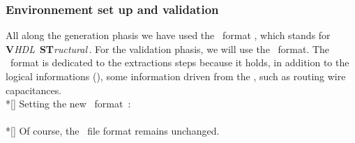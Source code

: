      \subsubsection{Environnement set up and validation}
     \nopagebreak
     \forceindent
       All along the generation phasis we have used the \netlist\ format \fvst,
     which stands for {\bf V}{\it HDL}\, {\bf ST}{\it ructural}\,. For the
     validation phasis, we will use the \fal\ format. The \fal\ format is
     dedicated to the extractions steps because it holds, in addition to
     the logical informations (\netlist), some information driven from
     the \layout, such as routing wire capacitances.
     \\*[\bigskipamount]
     \indent
       Setting the new \netlist\ format~:\\
     \nopagebreak
     \indent
     \\*[\bigskipamount]
     \nopagebreak
     \indent
       Of course, the \layout\ file format remains unchanged.
